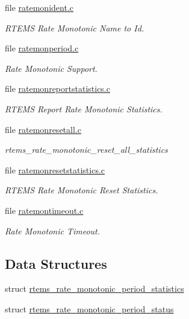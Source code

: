 \begin{DoxyCompactItemize}
file \mbox{\hyperlink{ratemonident_8c}{ratemonident.\+c}}
\begin{DoxyCompactList}\small\item\em R\+T\+E\+MS Rate Monotonic Name to Id. \end{DoxyCompactList}\item 
file \mbox{\hyperlink{ratemonperiod_8c}{ratemonperiod.\+c}}
\begin{DoxyCompactList}\small\item\em Rate Monotonic Support. \end{DoxyCompactList}\item 
file \mbox{\hyperlink{ratemonreportstatistics_8c}{ratemonreportstatistics.\+c}}
\begin{DoxyCompactList}\small\item\em R\+T\+E\+MS Report Rate Monotonic Statistics. \end{DoxyCompactList}\item 
file \mbox{\hyperlink{ratemonresetall_8c}{ratemonresetall.\+c}}
\begin{DoxyCompactList}\small\item\em rtems\+\_\+rate\+\_\+monotonic\+\_\+reset\+\_\+all\+\_\+statistics \end{DoxyCompactList}\item 
file \mbox{\hyperlink{ratemonresetstatistics_8c}{ratemonresetstatistics.\+c}}
\begin{DoxyCompactList}\small\item\em R\+T\+E\+MS Rate Monotonic Reset Statistics. \end{DoxyCompactList}\item 
file \mbox{\hyperlink{ratemontimeout_8c}{ratemontimeout.\+c}}
\begin{DoxyCompactList}\small\item\em Rate Monotonic Timeout. \end{DoxyCompactList}\end{DoxyCompactItemize}
\subsection*{Data Structures}
\begin{DoxyCompactItemize}
\item 
struct \mbox{\hyperlink{structrtems__rate__monotonic__period__statistics}{rtems\+\_\+rate\+\_\+monotonic\+\_\+period\+\_\+statistics}}
\item 
struct \mbox{\hyperlink{structrtems__rate__monotonic__period__status}{rtems\+\_\+rate\+\_\+monotonic\+\_\+period\+\_\+status}}
\end{DoxyCompactItemize}
